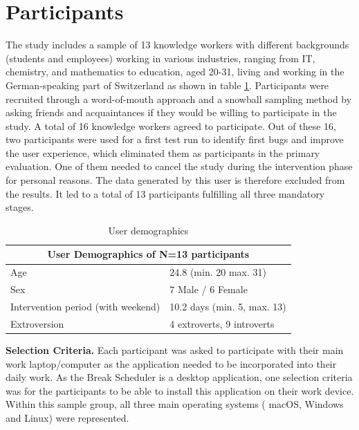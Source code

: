 \documentclass{hasel_thesis}
\begin{document}
\section{Participants}

 The study includes a sample of 13 knowledge workers with different backgrounds (students and employees) working in various industries, ranging from IT, chemistry, and mathematics to education, aged 20-31, living and working in the German-speaking part of Switzerland as shown in table \ref{table:demographics}. Participants were recruited through a word-of-mouth approach and a snowball sampling method by asking friends and acquaintances if they would be willing to participate in the study. A total of 16 knowledge workers agreed to participate. Out of these 16, two participants were used for a first test run to identify first bugs and improve the user experience, which eliminated them as participants in the primary evaluation. One of them needed to cancel the study during the intervention phase for personal reasons. The data generated by this user is therefore excluded from the results. It led to a total of 13 participants fulfilling all three mandatory stages.

 \begin{table}[h]
\centering
 \caption{User demographics}
    \begin{tabular}{ |p{3cm}||p{3cm}|  }
     \hline
     \multicolumn{2}{|c|}{User Demographics of N=13 participants} \\
    
     \hline
     Age & 24.8 (min. 20 max. 31) \\
     \hline
     Sex &   7 Male / 6 Female \\
     \hline
     Intervention period (with weekend) & 10.2 days (min. 5, max. 13)\\
     \hline
     Extroversion & 4 extroverts, 9 introverts \\
     \hline            
    \end{tabular}
 \label{table:demographics}
\end{table}
 
 \textbf{Selection Criteria.} Each participant was asked to participate with their main work laptop/computer as the application needed to be incorporated into their daily work. As the Break Scheduler is a desktop application, one selection criteria was for the participants to be able to install this application on their work device. Within this sample group, all three main operating systems ( macOS, Windows and Linux) were represented. 
\end{document}
